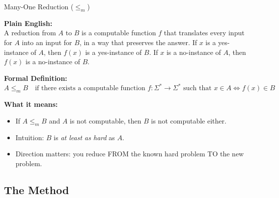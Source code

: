 \documentclass[11pt,a4paper]{article}
\newcommand{\fitmath}[1]{\begin{adjustbox}{max width=\linewidth}$\displaystyle #1$\end{adjustbox}}
\begin{document}
\begin{definitionbox}{Many-One Reduction ($\leq_m$)}

\textbf{Plain English:}\\
A reduction from $A$ to $B$ is a computable function $f$ that translates every input for $A$ into an input for $B$, in a way that preserves the answer. If $x$ is a yes-instance of $A$, then $f(x)$ is a yes-instance of $B$. If $x$ is a no-instance of $A$, then $f(x)$ is a no-instance of $B$.

\textbf{Formal Definition:}
\fitmath{A \leq_m B \quad\text{if there exists a computable function } f : \Sigma^* \to \Sigma^* \text{ such that } x \in A \iff f(x) \in B}

\textbf{What it means:}
\begin{itemize}
    \item If $A \leq_m B$ and $A$ is not computable, then $B$ is not computable either.
    \item Intuition: $B$ is \emph{at least as hard} as $A$.
    \item Direction matters: you reduce FROM the known hard problem TO the new problem.
\end{itemize}
\end{definitionbox}

\subsection{The Method}
\end{document}
